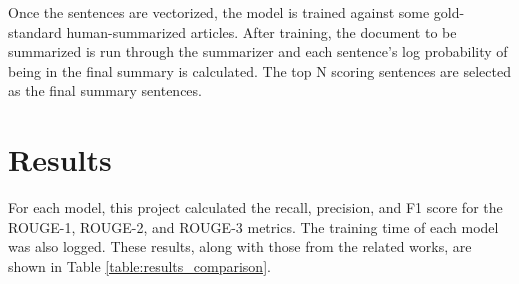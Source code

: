 \documentclass{IEEEtran}
\begin{document}
Once the sentences are vectorized, the model is trained against some gold-standard human-summarized articles. After training, the document to be summarized is run through the summarizer and each sentence's log probability of being in the final summary is calculated. The top N scoring sentences are selected as the final summary sentences.

\section{Results}
For each model, this project calculated the recall, precision, and F1 score for the ROUGE-1, ROUGE-2, and ROUGE-3 metrics. The training time of each model was also logged. These results, along with those from the related works, are shown in Table \ref{table:results_comparison}.
\end{document}

